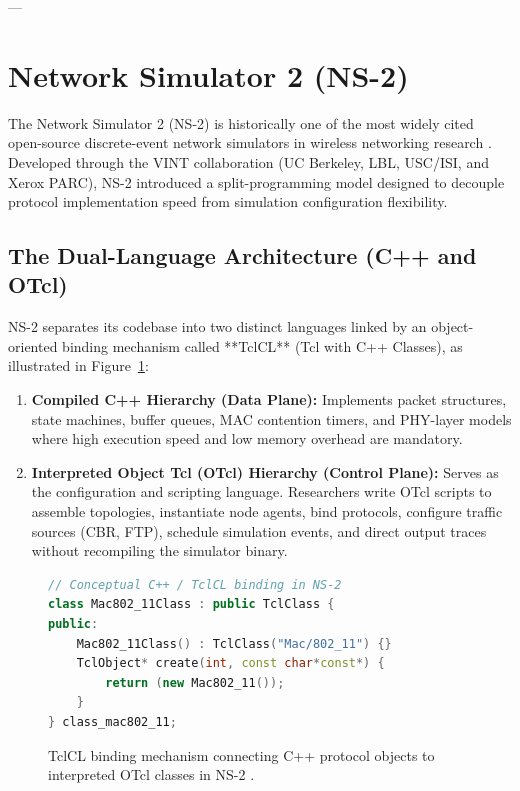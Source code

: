 ---

\section{Network Simulator 2 (NS-2)}
\label{sec:ns2_architecture}

The Network Simulator 2 (NS-2) is historically one of the most widely cited open-source discrete-event network simulators in wireless networking research \cite{fall2003ns}. Developed through the VINT collaboration (UC Berkeley, LBL, USC/ISI, and Xerox PARC), NS-2 introduced a split-programming model designed to decouple protocol implementation speed from simulation configuration flexibility.

\subsection{The Dual-Language Architecture (C++ and OTcl)}
NS-2 separates its codebase into two distinct languages linked by an object-oriented binding mechanism called **TclCL** (Tcl with C++ Classes), as illustrated in Figure~\ref{fig:ns2_arch}:
\begin{enumerate}
    \item \textbf{Compiled C++ Hierarchy (Data Plane):} Implements packet structures, state machines, buffer queues, MAC contention timers, and PHY-layer models where high execution speed and low memory overhead are mandatory.
    \item \textbf{Interpreted Object Tcl (OTcl) Hierarchy (Control Plane):} Serves as the configuration and scripting language. Researchers write OTcl scripts to assemble topologies, instantiate node agents, bind protocols, configure traffic sources (CBR, FTP), schedule simulation events, and direct output traces without recompiling the simulator binary.
\end{enumerate}

\begin{figure}[htbp]
\centering
\begin{minipage}{0.85\textwidth}
\begin{lstlisting}[language=C++]
// Conceptual C++ / TclCL binding in NS-2
class Mac802_11Class : public TclClass {
public:
    Mac802_11Class() : TclClass("Mac/802_11") {}
    TclObject* create(int, const char*const*) {
        return (new Mac802_11());
    }
} class_mac802_11;
\end{lstlisting}
\end{minipage}
\caption{TclCL binding mechanism connecting C++ protocol objects to interpreted OTcl classes in NS-2 \cite{fall2003ns}.}
\label{fig:ns2_arch}
\end{figure}

